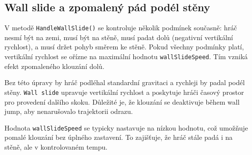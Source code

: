 \subsection{Wall slide a zpomalený pád podél stěny}

V metodě \texttt{HandleWallSlide()} se kontroluje několik podmínek současně: hráč nesmí být na zemi, musí být na stěně, musí padat dolů (negativní vertikální rychlost), a musí držet pohyb směrem ke stěně. Pokud všechny podmínky platí, vertikální rychlost se ořízne na maximální hodnotu \texttt{wallSlideSpeed}. Tím vzniká efekt zpomaleného klouzání dolů.

Bez této úpravy by hráč podléhal standardní gravitaci a rychleji by padal podél stěny. \texttt{Wall slide} upravuje vertikální rychlost a poskytuje hráči časový prostor pro provedení dalšího skoku. Důležité je, že klouzání se deaktivuje během wall jump, aby nenarušovalo trajektorii odrazu.

Hodnota \texttt{wallSlideSpeed} se typicky nastavuje na nízkou hodnotu, což umožňuje pomalé klouzání bez úplného zastavení. To zajišťuje, že hráč stále padá i na stěně, ale v kontrolovaném tempu.